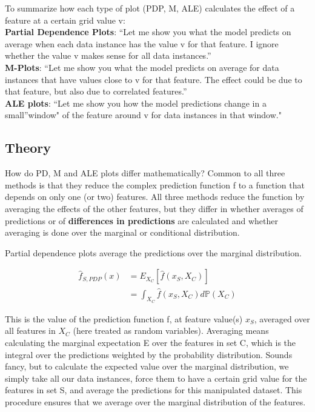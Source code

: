 \documentclass[12pt,]{krantz}
\begin{document}
To summarize how each type of plot (PDP, M, ALE) calculates the effect
of a feature at a certain grid value v:\\
\textbf{Partial Dependence Plots}: ``Let me show you what the model
predicts on average when each data instance has the value v for that
feature. I ignore whether the value v makes sense for all data
instances.''\\
\textbf{M-Plots}: ``Let me show you what the model predicts on average
for data instances that have values close to v for that feature. The
effect could be due to that feature, but also due to correlated
features.''\\
\textbf{ALE plots}: ``Let me show you how the model predictions change
in a small''window" of the feature around v for data instances in that
window."

\subsection{Theory}\label{theory-2}

How do PD, M and ALE plots differ mathematically? Common to all three
methods is that they reduce the complex prediction function f to a
function that depends on only one (or two) features. All three methods
reduce the function by averaging the effects of the other features, but
they differ in whether averages of predictions or of \textbf{differences
in predictions} are calculated and whether averaging is done over the
marginal or conditional distribution.

Partial dependence plots average the predictions over the marginal
distribution.

\begin{align*}
\hat{f}_{S,PDP}(x)&=E_{X_C}\left[\hat{f}(x_S,X_C)\right] \\
& = \int_{X_C}\hat{f}(x_S,X_C)d\mathbb{P}(X_C)
\end{align*}

This is the value of the prediction function f, at feature value(s)
\(x_S\), averaged over all features in \(X_C\) (here treated as random
variables). Averaging means calculating the marginal expectation E over
the features in set C, which is the integral over the predictions
weighted by the probability distribution. Sounds fancy, but to calculate
the expected value over the marginal distribution, we simply take all
our data instances, force them to have a certain grid value for the
features in set S, and average the predictions for this manipulated
dataset. This procedure ensures that we average over the marginal
distribution of the features.
\end{document}
